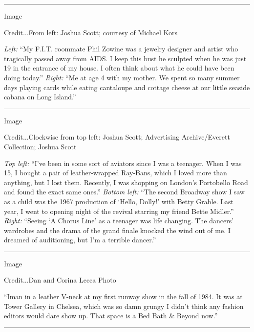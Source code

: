 \begin{center}\rule{0.5\linewidth}{\linethickness}\end{center}

Image

Credit...From left: Joshua Scott; courtesy of Michael Kors

\emph{Left:} ``My F.I.T. roommate Phil Zowine was a jewelry designer and
artist who tragically passed away from AIDS. I keep this bust he
sculpted when he was just 19 in the entrance of my house. I often think
about what he could have been doing today.'' \emph{Right:} ``Me at age 4
with my mother. We spent so many summer days playing cards while eating
cantaloupe and cottage cheese at our little seaside cabana on Long
Island.''

\begin{center}\rule{0.5\linewidth}{\linethickness}\end{center}

Image

Credit...Clockwise from top left: Joshua Scott; Advertising
Archive/Everett Collection; Joshua Scott

\emph{Top left:} ``I've been in some sort of aviators since I was a
teenager. When I was 15, I bought a pair of leather-wrapped Ray-Bans,
which I loved more than anything, but I lost them. Recently, I was
shopping on London's Portobello Road and found the exact same ones.''
\emph{Bottom left:} ``The second Broadway show I saw as a child was the
1967 production of `Hello, Dolly!' with Betty Grable. Last year, I went
to opening night of the revival starring my friend Bette Midler.''
\emph{Right:} ``Seeing `A Chorus Line' as a teenager was life changing.
The dancers' wardrobes and the drama of the grand finale knocked the
wind out of me. I dreamed of auditioning, but I'm a terrible dancer.''

\begin{center}\rule{0.5\linewidth}{\linethickness}\end{center}

Image

Credit...Dan and Corina Lecca Photo

``Iman in a leather V-neck at my first runway show in the fall of 1984.
It was at Tower Gallery in Chelsea, which was so damn grungy I didn't
think any fashion editors would dare show up. That space is a Bed Bath
\& Beyond now.''

\begin{center}\rule{0.5\linewidth}{\linethickness}\end{center}

